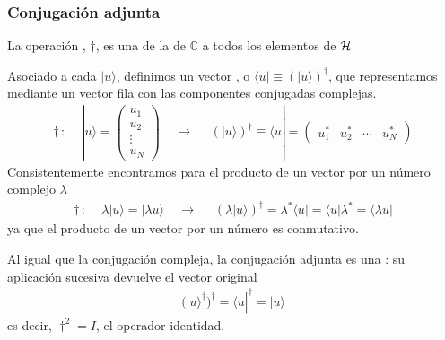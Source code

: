 \documentclass[letterpaper,10pt,english]{jupyterBook}
\newcommand{\bra}[1]{\langle #1|}
\newcommand{\ket}[1]{|#1\rangle}
\newcommand{\Hil}{{\cal H}}
\begin{document}
\subsubsection{Conjugación adjunta}
\label{\detokenize{docs/Part_01_Formalismo/Chapter_01_02_Formalismo_matem_xe1tico/01_02_Vectores_myst:conjugacion-adjunta}}
\sphinxAtStartPar
La operación ,  \(\dagger\), es una  de la  de \({\mathbb C}\) a todos los elementos  de \(\Hil\)

\sphinxAtStartPar
Asociado a cada  \(\ket{u}\), definimos un vector , o  \(\bra{u}\equiv\left(\ket{u}\right)^\dagger\),  que representamos mediante un vector fila con las componentes conjugadas complejas.
\begin{equation*}
\begin{split}
\dagger \,: \quad\,|u\rangle = \begin{pmatrix} {u_1}\\ {u_2}\\ \vdots \\ {u_N} 
\end{pmatrix} ~~~~~{\rightarrow}~~~~~~ \left(\ket{u}\right)^\dagger \equiv \bra{u} =\begin{pmatrix} {u_1^*} & {u_2^*} & \cdots & {u_N^*}
\end{pmatrix}
\end{split}
\end{equation*}
\sphinxAtStartPar
Consistentemente encontramos para el producto de un vector por un número complejo \(\lambda\)
\begin{equation*}
\begin{split}
\dagger \,:\quad\,  \lambda\ket{u}=\ket{\lambda u} ~~~~~{\rightarrow}~~~~~~ \left(\lambda\ket{u}\right)^\dagger=\lambda^*\bra{u} = \bra{u}\lambda^* = \bra{\lambda u}
\end{split}
\end{equation*}
\sphinxAtStartPar
ya que el producto de un vector por un número es conmutativo.

\sphinxAtStartPar
Al igual que la conjugación compleja, la conjugación adjunta es una : su aplicación sucesiva devuelve el vector original
\begin{equation*}
\begin{split}
(\ket{u}^\dagger)^\dagger =\bra{u}^\dagger =  \ket{u}
\end{split}
\end{equation*}
\sphinxAtStartPar
es decir, \(\dagger^2 = I\), el operador identidad.
\end{document}
